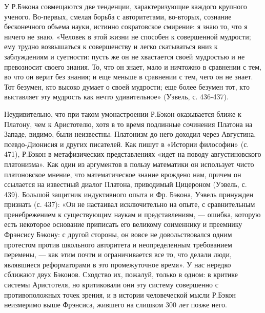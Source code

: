 У Р.Бэкона совмещаются две тенденции, характеризующие каждого
крупного ученого. Во-первых, смелая борьба с авторитетами, во-вторых,
сознание бесконечного объема науки, истинно сократовское смирение: я
знаю то, что я ничего не знаю. «Человек в этой жизни не способен к
совершенной мудрости; ему трудно возвышаться к совершенству и легко
скатываться вниз к заблуждениям и суетности: пусть же он не хвастается
своей мудростью и не превозносит своего знания. То, что он знает, мало
и ничтожно в сравнении с тем, во что он верит без знания; и еще меньше
в сравнении с тем, чего он не знает. Тот безумен, кто высоко думает о
своей мудрости; еще более безумен тот, кто выставляет эту мудрость как
нечто удивительное» (Уэвель, с. 436-437).

Неудивительно, что при таком умонастроении Р.Бэкон оказывается ближе
к Платону, чем к Аристотелю, хотя в то время подлинные сочинения
Платона на Западе, видимо, были неизвестны. Платонизм до него доходил
через Августина, псевдо-Дионисия и других писателей. Как пишут в
«Истории философии» (с. 471), Р.Бэкон в метафизических представлениях
«идет на поводу августиновского платонизма». Как один из аргументов в
пользу математики он использует чисто платоновское мнение, что
математическое знание врождено нам, причем он ссылается на известный
диалог Платона, приводимый Цицероном (Уэвель, с. 439). Большой
защитник индуктивного опыта и Фр. Бэкона, Уэвель принужден признать
(с. 437): «Он не настаивал исключительно на опыте, с сравнительным
пренебрежением к существующим наукам и представлениям, --- ошибка,
которую есть некоторое основание приписать его великому соименнику и
преемнику Фрэнсису Бэкону: с другой стороны, он вовсе не
довольствовался одним протестом против школьного авторитета и
неопределенным требованием перемены, --- как этим почти и
ограничивается все то, что делали люди, являвшиеся реформаторами в это
промежуточное время». У нас нередко сближают двух Бэконов. Сходство
их, пожалуй, только в одном: в критике системы Аристотеля, но
критиковали они эту систему совершенно с противоположных точек зрения,
и в истории человеческой мысли Р.Бэкон неизмеримо выше Фрэнсиса,
жившего на слишком 300 лет позже него.

